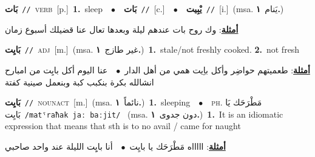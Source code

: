 \documentclass[10pt,a4paper,twoside]{article} %
\begin{document}
\begin{multicols}{2}
{\setlength\topsep{0pt}\textbf{\foreignlanguage{arabic}{بَات}}\ {\color{gray}\texttt{//}\color{black}}\ \textsc{verb}\ [p.]\ \textbf{1.}~sleep\ \ $\bullet$\ \ \setlength\topsep{0pt}\textbf{\foreignlanguage{arabic}{بَات}}\ {\color{gray}\texttt{//}\color{black}}\ [c.]\ \ $\bullet$\ \ \setlength\topsep{0pt}\textbf{\foreignlanguage{arabic}{يْبِيت}}\ {\color{gray}\texttt{//}\color{black}}\ [i.]\ \color{gray}(msa. \foreignlanguage{arabic}{يَنام}~\foreignlanguage{arabic}{\textbf{١.}})\color{black}\  \begin{flushright}\color{gray}\foreignlanguage{arabic}{\textbf{\underline{\foreignlanguage{arabic}{أمثلة}}}: وك روح بات عندهم ليلة وبعدها تعال عنا قضيلك أسبوع زمان}\end{flushright}\color{black}} \vspace{2mm}

{\setlength\topsep{0pt}\textbf{\foreignlanguage{arabic}{بَايِت}}\ {\color{gray}\texttt{//}\color{black}}\ \textsc{adj}\ [m.]\ \color{gray}(msa. \foreignlanguage{arabic}{غير طازج}~\foreignlanguage{arabic}{\textbf{١.}})\color{black}\ \textbf{1.}~stale/not freshly cooked.  \textbf{2.}~not fresh\  \begin{flushright}\color{gray}\foreignlanguage{arabic}{\textbf{\underline{\foreignlanguage{arabic}{أمثلة}}}: طعميتهم حواضِر وأكل باِيت همي من أهل الدار\ $\bullet$\ \  عنا اليوم أكل بايِت من امبارح انشالله بكرة بنكبب كبة وبنعمل صينية كفتة}\end{flushright}\color{black}} \vspace{2mm}

{\setlength\topsep{0pt}\textbf{\foreignlanguage{arabic}{بَايِت}}\ {\color{gray}\texttt{//}\color{black}}\ \textsc{noun\textunderscore act}\ [m.]\ \color{gray}(msa. \foreignlanguage{arabic}{نائماً}~\foreignlanguage{arabic}{\textbf{١.}})\color{black}\ \textbf{1.}~sleeping\ \ $\bullet$\ \ \textsc{ph.} \color{gray} \foreignlanguage{arabic}{مَطْرَحَك يَا بَايِت}\color{black}\ {\color{gray}\texttt{/{\sffamily matˤraħak jaː baːjit}/}\color{black}}\ \color{gray} (msa. \foreignlanguage{arabic}{دون جدوى}~\foreignlanguage{arabic}{\textbf{١.}})\color{black}\ \textbf{1.}~It is an idiomatic expression that means that sth is to no avail / came for naught\  \begin{flushright}\color{gray}\foreignlanguage{arabic}{\textbf{\underline{\foreignlanguage{arabic}{أمثلة}}}: اااااه مَطْرَحَك يا بايِت\ $\bullet$\ \  أنا بايِِت الليلة عند واحد صاحبي}\end{flushright}\color{black}} \vspace{2mm}


\end{multicols}
\end{document}
